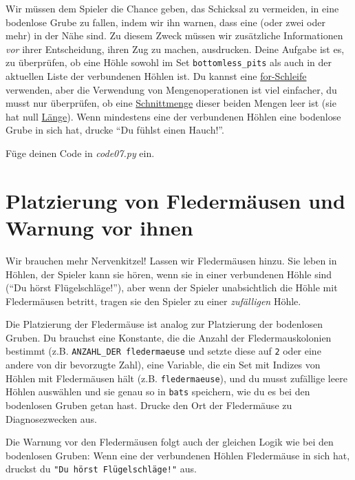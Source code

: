 \documentclass[
]{book}
\begin{document}
Wir müssen dem Spieler die Chance geben, das Schicksal zu vermeiden, in eine bodenlose Grube zu fallen, indem wir ihn warnen, dass eine (oder zwei oder mehr) in der Nähe sind. Zu diesem Zweck müssen wir zusätzliche Informationen \emph{vor} ihrer Entscheidung, ihren Zug zu machen, ausdrucken. Deine Aufgabe ist es, zu überprüfen, ob eine Höhle sowohl im Set \texttt{bottomless\_pits} als auch in der aktuellen Liste der verbundenen Höhlen ist. Du kannst eine \protect\hyperlink{for-loop}{for-Schleife} verwenden, aber die Verwendung von Mengenoperationen ist viel einfacher, du musst nur überprüfen, ob eine \href{https://docs.python.org/3/library/stdtypes.html\#frozenset.intersection}{Schnittmenge} dieser beiden Mengen leer ist (sie hat null \href{https://docs.python.org/3/library/functions.html\#len}{Länge}). Wenn mindestens eine der verbundenen Höhlen eine bodenlose Grube in sich hat, drucke ``Du fühlst einen Hauch!''.

Füge deinen Code in \emph{code07.py} ein.

\hypertarget{platzierung-von-fledermuxe4usen-und-warnung-vor-ihnen}{%
\section{Platzierung von Fledermäusen und Warnung vor ihnen}\label{platzierung-von-fledermuxe4usen-und-warnung-vor-ihnen}}

Wir brauchen mehr Nervenkitzel! Lassen wir Fledermäusen hinzu. Sie leben in Höhlen, der Spieler kann sie hören, wenn sie in einer verbundenen Höhle sind (``Du hörst Flügelschläge!''), aber wenn der Spieler unabsichtlich die Höhle mit Fledermäusen betritt, tragen sie den Spieler zu einer \emph{zufälligen} Höhle.

Die Platzierung der Fledermäuse ist analog zur Platzierung der bodenlosen Gruben. Du brauchst eine Konstante, die die Anzahl der Fledermauskolonien bestimmt (z.B. \texttt{ANZAHL\_DER\ fledermaeuse} und setzte diese auf \texttt{2} oder eine andere von dir bevorzugte Zahl), eine Variable, die ein Set mit Indizes von Höhlen mit Fledermäusen hält (z.B. \texttt{fledermaeuse}), und du musst zufällige leere Höhlen auswählen und sie genau so in \texttt{bats} speichern, wie du es bei den bodenlosen Gruben getan hast. Drucke den Ort der Fledermäuse zu Diagnosezwecken aus.

Die Warnung vor den Fledermäusen folgt auch der gleichen Logik wie bei den bodenlosen Gruben: Wenn eine der verbundenen Höhlen Fledermäuse in sich hat, druckst du \texttt{"Du\ hörst\ Flügelschläge!"} aus.
\end{document}
